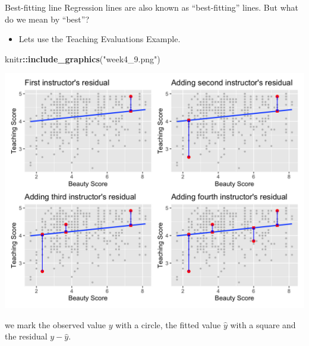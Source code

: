 \documentclass[
  ignorenonframetext,
]{beamer}
\newenvironment{Shaded}{\begin{snugshade}}{\end{snugshade}}
\newcommand{\FunctionTok}[1]{\textcolor[rgb]{0.13,0.29,0.53}{\textbf{#1}}}
\newcommand{\NormalTok}[1]{#1}
\newcommand{\SpecialCharTok}[1]{\textcolor[rgb]{0.81,0.36,0.00}{\textbf{#1}}}
\newcommand{\StringTok}[1]{\textcolor[rgb]{0.31,0.60,0.02}{#1}}
\providecommand{\tightlist}{%
  \setlength{\itemsep}{0pt}\setlength{\parskip}{0pt}}
\begin{document}
\begin{frame}[fragile]{Best-fitting line}
\protect\hypertarget{best-fitting-line}{}
Regression lines are also known as ``best-fitting'' lines. But what do
we mean by ``best''?

\begin{itemize}
\tightlist
\item
  Lets use the Teaching Evaluations Example.
\end{itemize}

\begin{Shaded}
\begin{Highlighting}[]
\NormalTok{knitr}\SpecialCharTok{::}\FunctionTok{include\_graphics}\NormalTok{(}\StringTok{"week4\_9.png"}\NormalTok{)}
\end{Highlighting}
\end{Shaded}

\begin{center}\includegraphics[width=0.8\linewidth,height=0.5\textheight]{week4_9} \end{center}

we mark the observed value \(y\) with a circle, the fitted value
\(\hat{y}\) with a square and the residual \(y-\hat{y}\).
\end{frame}
\end{document}
